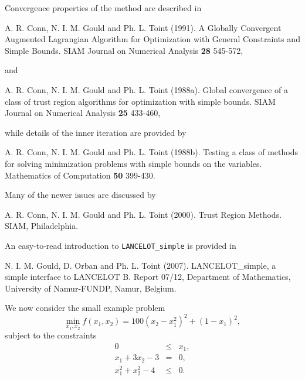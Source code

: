 \documentclass{galahad}
\begin{document}
Convergence properties of the method are described in

\noindent
A. R. Conn, N. I. M. Gould and Ph. L. Toint (1991).
A Globally Convergent Augmented {L}agrangian Algorithm for
Optimization with General Constraints and Simple Bounds.
SIAM Journal on Numerical Analysis {\bf 28} 545-572,

\noindent
and

\noindent
A. R. Conn, N. I. M. Gould and Ph. L. Toint (1988a).
Global convergence of a class of trust region algorithms
for optimization with simple bounds.
SIAM Journal on Numerical Analysis {\bf 25} 433-460,

\noindent
while details of the inner iteration are provided by

\noindent
A. R. Conn, N. I. M. Gould and Ph. L. Toint (1988b).
Testing a class of methods for solving minimization
problems with simple bounds on the variables.
Mathematics of Computation {\bf 50} 399-430.

Many of the newer issues are discussed by

\noindent
A. R. Conn, N. I. M. Gould and Ph. L. Toint (2000).
Trust Region Methods.
SIAM, Philadelphia.

\noindent
An easy-to-read introduction to {\tt LANCELOT\_simple} is provided in

\noindent
N. I. M. Gould, D. Orban and Ph. L. Toint (2007).
LANCELOT\_simple, a simple interface to LANCELOT B.
Report 07/12, Department of Mathematics, University of Namur-FUNDP, Namur,
Belgium.


\galexample
We now consider the small example problem
\[
\min_{x_1,x_2 } f( x_1, x_2 ) = 100 ( x_2 - x_1^2 )^2 + ( 1 - x_1 )^2,
\]
subject to the constraints
\[
\begin{array}{rcl}
0  & \leq & x_1, \\
x_1 + 3x_2   - 3  &  = &  0,\\
x_1^2 + x_2^2 - 4 &  \leq & 0.
\end{array}
\]
\end{document}
